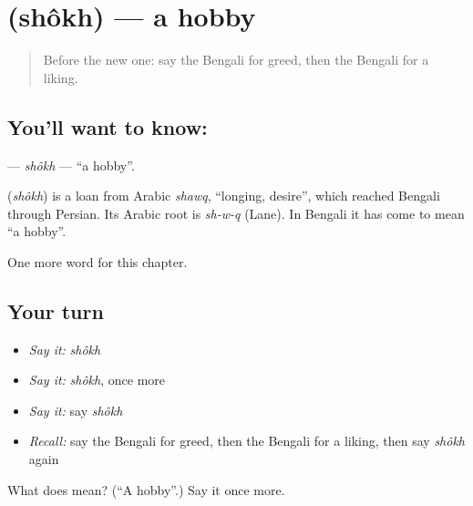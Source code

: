 \section[\texorpdfstring{\bn{শখ} (shôkh)}{শখ (shôkh)}]{ (shôkh) — a hobby}

\label{lesson:BN-C97-shokh}



\begin{quote}
Before the new one: say the Bengali for greed, then the Bengali for a liking.
\end{quote}

\subsection*{You'll want to know: }
\textbf{} — \emph{shôkh} — \textquotedblleft{}a hobby\textquotedblright{}.

\begin{cousinweb}
\textbf{} (\emph{shôkh}) is a loan from Arabic \emph{shawq}, \textquotedblleft{}longing, desire\textquotedblright{}, which reached Bengali through Persian. Its Arabic root is \emph{sh-w-q} (Lane). In Bengali it has come to mean \textquotedblleft{}a hobby\textquotedblright{}.
\end{cousinweb}

\begin{grammarlens}[title={What you've built}]
One more word for this chapter.
\end{grammarlens}

\subsection*{Your turn}
\begin{itemize}
\raggedright
  \item \emph{Say it:} \emph{shôkh}
  \item \emph{Say it:} \emph{shôkh}, once more
  \item \emph{Say it:} say \emph{shôkh}
  \item \emph{Recall:} say the Bengali for greed, then the Bengali for a liking, then say \emph{shôkh} again
\end{itemize}

\begin{tcolorbox}[breakable,colback=teal!4,colframe=teal!35!black,title={Before you move on}]
What does  mean? (\textquotedblleft{}A hobby\textquotedblright{}.) Say it once more.
\end{tcolorbox}
